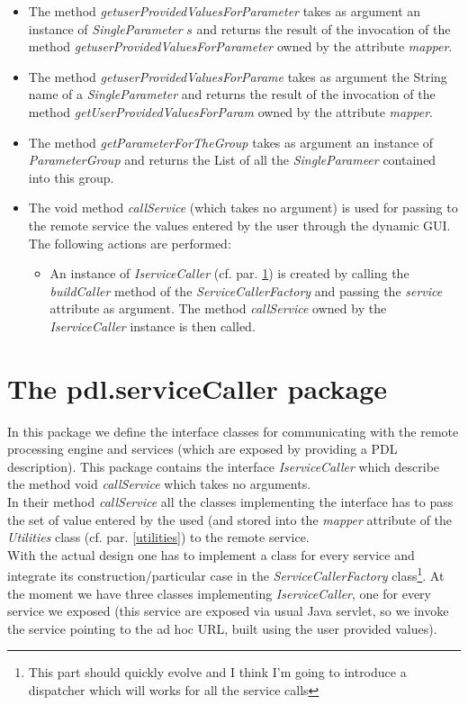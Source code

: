 \documentclass[a4paper,11pt] {ivoa}
\begin{document}
\begin{itemize}
\begin{itemize}
\item The method {\it getuserProvidedValuesForParameter} takes as argument an instance of {\it SingleParameter} $s$ and returns the result of the invocation of the method {\it getuserProvidedValuesForParameter} owned by the attribute {\it mapper}.
\item The method {\it getuserProvidedValuesForParame} takes as argument the String name of a {\it SingleParameter} and returns the result of the invocation of the method {\it getUserProvidedValuesForParam} owned by the attribute {\it mapper}.
\item The method {\it getParameterForTheGroup} takes as argument an instance of {\it ParameterGroup} and returns the List of all the {\it SingleParameer} contained into this group.
\item The void method {\it callService} (which takes no argument) is used for passing to the remote service the values entered by the user through the dynamic GUI. The following actions are performed:
\begin{itemize}
\item An instance of {\it IserviceCaller} (cf. par. \ref{serviceCaller}) is created by calling the {\it buildCaller} method of the  {\it ServiceCallerFactory} and passing the {\it service} attribute as argument. The method {\it callService} owned by the {\it IserviceCaller} instance is then called.
\end{itemize}
\end{itemize}
\end{itemize}

\section{ The pdl.serviceCaller package}\label{serviceCaller}
In this package we define the interface classes for communicating with the remote processing engine and services (which are exposed by providing a PDL description). This package contains the interface {\it IserviceCaller} which describe  the method void {\it callService} which takes no arguments.\\
In their method {\it callService} all the classes implementing the interface has to pass the set of value entered by the used (and stored into the {\it mapper} attribute of the {\it Utilities} class (cf. par. \ref{utilities}) to the remote service.\\
With the actual design one has to implement a class for every service and integrate its construction/particular case in the {\it ServiceCallerFactory} class\footnote{This part should quickly evolve and I think I'm going to introduce a dispatcher which will works for all the service calls}. At the moment we have three classes implementing {\it IserviceCaller}, one for every service we exposed (this service are exposed via usual Java servlet, so we invoke the service pointing to the ad hoc URL, built using the user provided values).\\
\end{document}

